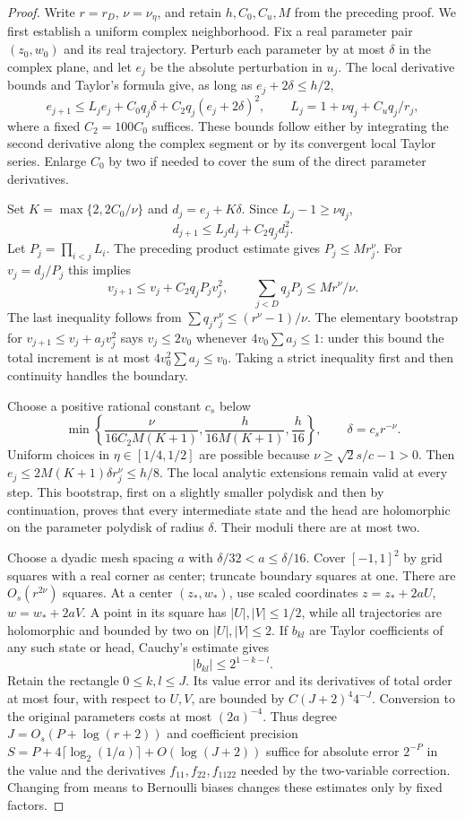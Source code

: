 \begin{proof}
Write $r=r_D$, $\nu=\nu_\eta$, and retain $h,C_0,C_u,M$ from
the preceding proof. We first establish a uniform complex
neighborhood. Fix a real parameter pair $(z_0,w_0)$ and its real
trajectory. Perturb each parameter by at most $\delta$ in the
complex plane, and let $e_j$ be the absolute perturbation in
$u_j$. The local derivative bounds and Taylor's formula give,
as long as $e_j+2\delta\le h/2$,
\[
 e_{j+1}\le L_j e_j+C_0q_j\delta
                  +C_2q_j(e_j+2\delta)^2,
 \qquad L_j=1+\nu q_j+C_uq_j/r_j,
\]
where a fixed $C_2=100C_0$ suffices. These bounds follow either
by integrating the second derivative along the complex segment
or by its convergent local Taylor series. Enlarge $C_0$ by two
if needed to cover the sum of the direct parameter derivatives.

Set $K=\max\{2,2C_0/\nu\}$ and $d_j=e_j+K\delta$.
Since $L_j-1\ge\nu q_j$,
\[
 d_{j+1}\le L_jd_j+C_2q_jd_j^2.
\]
Let $P_j=\prod_{i<j}L_i$. The preceding product estimate gives
$P_j\le Mr_j^\nu$. For $v_j=d_j/P_j$ this implies
\[
 v_{j+1}\le v_j+C_2q_jP_jv_j^2,
 \qquad
 \sum_{j<D}q_jP_j\le Mr^\nu/\nu.
\]
The last inequality follows from
$\sum q_jr_j^\nu\le(r^\nu-1)/\nu$.
The elementary bootstrap for $v_{j+1}\le v_j+a_jv_j^2$
says $v_j\le2v_0$ whenever $4v_0\sum a_j\le1$:
under this bound the total increment is at most
$4v_0^2\sum a_j\le v_0$. Taking a strict inequality first
and then continuity handles the boundary.

Choose a positive rational constant $c_s$ below
\[
 \min\left\{\frac{\nu}{16C_2M(K+1)},
              \frac{h}{16M(K+1)},\frac h{16}\right\},
 \qquad \delta=c_s r^{-\nu}.
\]
Uniform choices in $\eta\in[1/4,1/2]$ are possible because
$\nu\ge\sqrt2s/c-1>0$. Then
$e_j\le2M(K+1)\delta r_j^\nu\le h/8$.
The local analytic extensions remain valid at every step.
This bootstrap, first on a slightly smaller polydisk and then
by continuation, proves that every intermediate state and the
head are holomorphic on the parameter polydisk of radius
$\delta$. Their moduli there are at most two.

Choose a dyadic mesh spacing $a$ with
$\delta/32<a\le\delta/16$. Cover $[-1,1]^2$ by grid squares
with a real corner as center; truncate boundary squares at one.
There are $O_s(r^{2\nu})$ squares. At a center $(z_*,w_*)$,
use scaled coordinates
$z=z_*+2aU$, $w=w_*+2aV$. A point in its square has
$|U|,|V|\le1/2$, while all trajectories are holomorphic and
bounded by two on $|U|,|V|\le2$. If $b_{kl}$ are Taylor
coefficients of any such state or head, Cauchy's estimate gives
\[
 |b_{kl}|\le2^{1-k-l}.
\]
Retain the rectangle $0\le k,l\le J$. Its value error and
its derivatives of total order at most four, with respect to
$U,V$, are bounded by $C(J+2)^4 4^{-J}$. Conversion to the
original parameters costs at most $(2a)^{-4}$. Thus degree
$J=O_s(P+\log(r+2))$ and coefficient precision
$S=P+4\lceil\log_2(1/a)\rceil+O(\log(J+2))$ suffice for
absolute error $2^{-P}$ in the value and the derivatives
$f_{11},f_{22},f_{1122}$ needed by the two-variable correction.
Changing from means to Bernoulli biases changes these estimates
only by fixed factors.


\end{proof}
